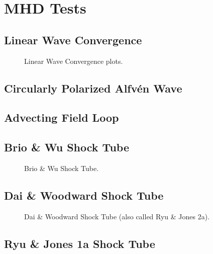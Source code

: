 \section{MHD Tests}
\label{sec:mhd-tests}

\subsection{Linear Wave Convergence}

\begin{figure}[ht!]
    \caption{Linear Wave Convergence plots. 
    }
    \label{fig:linear-wave-convergence}
\end{figure}

\subsection{Circularly Polarized Alfv\'en Wave}
\subsection{Advecting Field Loop}
\subsection{Brio \& Wu Shock Tube}

\begin{figure}[ht!]
    \caption{Brio \& Wu Shock Tube. 
    }
    \label{fig:brio-and-wu}
\end{figure}

\subsection{Dai \& Woodward Shock Tube}

\begin{figure}[ht!]
    \caption{Dai \& Woodward Shock Tube (also called Ryu \& Jones 2a).
    }
    \label{fig:dai-and-woodward}
\end{figure}

\subsection{Ryu \& Jones 1a Shock Tube}

